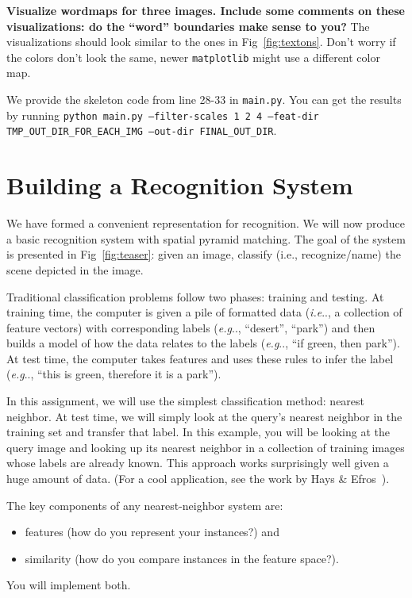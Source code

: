 \documentclass[11pt]{article}
\makeatletter
\numberwithin{equation}{section} %
\numberwithin{figure}{section} %
\numberwithin{table}{section} %
\DeclareRobustCommand\onedot{\futurelet\@let@token\@onedot}
\def\@onedot{\ifx\@let@token.\else.\null\fi\xspace}
\def\eg{\emph{e.g}\onedot} \def\Eg{\emph{E.g}\onedot}
\def\ie{\emph{i.e}\onedot} \def\Ie{\emph{I.e}\onedot}
\makeatother
\begin{document}
{\bf Visualize wordmaps for three images. Include some comments on these visualizations: do the ``word'' boundaries make sense to you?} The visualizations should look similar to the ones in Fig~\ref{fig:textons}. Don't worry if the colors don't look the same, newer {\tt matplotlib} might use a different color map.

We provide the skeleton code from line 28-33 in {\tt main.py}. You can get the results by running {\tt python main.py --filter-scales 1 2 4 --feat-dir TMP\_OUT\_DIR\_FOR\_EACH\_IMG --out-dir FINAL\_OUT\_DIR}.

\begin{your_solution}[title=Q1.3,height=23cm,width=\linewidth]

\end{your_solution}

\clearpage


\section{Building a Recognition System}
\label{sec:img_recog}
We have formed a convenient representation for recognition. We will now
produce a basic recognition system with spatial pyramid matching. The goal of the system is presented in Fig~\ref{fig:teaser}:
given an image, classify (i.e., recognize/name) the scene depicted in the image.

Traditional classification problems follow two phases: training and testing.
At training time, the computer is given a pile of formatted data (\ie, a collection
of feature vectors) with corresponding labels (\eg, ``desert'', ``park'') and
then builds a model of how the data relates to the labels (\eg, ``if green, then park''). At test time, the computer takes features and uses these rules to infer the label (\eg, ``this is green, therefore it is a park'').

In this assignment, we will use the simplest classification method: nearest neighbor.
At test time, we will simply look at the query's nearest neighbor in the training set
and transfer that label. In this example, you will be looking
at the query image and looking up its nearest neighbor in a collection of training images whose labels are already known. This approach works
surprisingly well given a huge amount of data. (For a cool application, see the work by Hays \& Efros~\cite{Hays:2007}). 

The key components of any nearest-neighbor system are:
\begin{itemize}
\item features (how do you represent your instances?) and
\item similarity (how do you compare instances in the feature space?).
\end{itemize} You will implement both.
\end{document}
